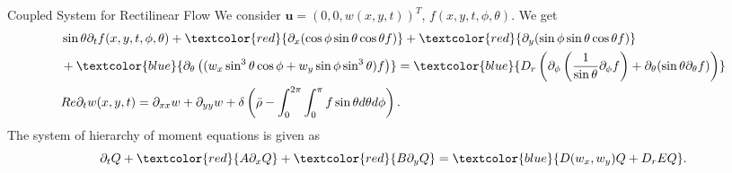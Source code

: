 \begin{frame}{Coupled System for Rectilinear Flow}
	\scriptsize
We consider $\boldsymbol{u} = \left( 0, 0, w(x,y, t)\right)^T$, $f(x,y,t,\phi,\theta)$. We get
\begin{equation}
	\begin{aligned}
		&\sin\theta \partial_{t}f(x,y,t,\phi, \theta)+ \textcolor{red}{\partial_x(\cos\phi \sin\theta \cos\theta f)} + \textcolor{red}{\partial_y(\sin \phi \sin \theta \cos \theta f)} \\
		&+ \textcolor{blue}{\partial_\theta\left(( w_x \sin^3 \theta \cos \phi + w_y\sin \phi \sin^3 \theta) f\right)}
		= \textcolor{blue}{D_{r}\left( \partial_\phi \left(\frac{1}{\sin \theta} \partial_\phi f \right)+ \partial_\theta (\sin \theta \partial_\theta f)\right)} \\
		&Re\partial_{t}w(x,y,t) = \partial_{xx}w + \partial_{yy}w + \delta\left(\bar{\rho}-\int_{0}^{2\pi} \int_{0}^{\pi} f \sin \theta d\theta d\phi \right).
	\end{aligned}
\end{equation}
The system of hierarchy of moment equations is given as
	\begin{equation}
		\partial_t Q + \textcolor{red}{A  \partial_x Q}
		+ \textcolor{red}{B \partial_y Q} =  \textcolor{blue}{ D(w_x,w_y)Q+ D_rEQ}.
	\end{equation}
\end{frame}

